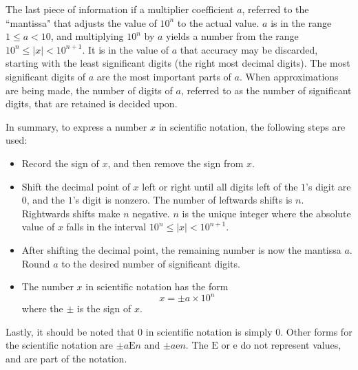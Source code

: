 \documentclass{article}
\begin{document}
The last piece of information if a multiplier coefficient \(a\), referred to the ``mantissa" that adjusts the value of \(10^n\) to the actual value. \(a\) is in the range \(1 \leq a < 10\), and multiplying \(10^n\) by \(a\) yields a number from the range \(10^n \leq |x| < 10^{n+1}\). It is in the value of \(a\) that accuracy may be discarded, starting with the least significant digits (the right most decimal digits). The most significant digits of \(a\) are the most important parts of \(a\). When approximations are being made, the number of digits of \(a\), referred to as the number of significant digits, that are retained is decided upon. 

In summary, to express a number \(x\) in scientific notation, the following steps are used: 

\begin{itemize}
\item Record the sign of \(x\), and then remove the sign from \(x\).
\item Shift the decimal point of \(x\) left or right until all digits left of the \(1\)'s digit are \(0\), and the \(1\)'s digit is nonzero. The number of leftwards shifts is \(n\). Rightwards shifts make \(n\) negative. \(n\) is the unique integer where the absolute value of \(x\) falls in the interval \(10^n \leq |x| < 10^{n+1}\).  
\item After shifting the decimal point, the remaining number is now the mantissa \(a\). Round \(a\) to the desired number of significant digits.
\item The number \(x\) in scientific notation has the form 
\[x = \pm a \times 10^n\]
where the \(\pm\) is the sign of \(x\).
\end{itemize}  
Lastly, it should be noted that \(0\) in scientific notation is simply \(0\). Other forms for the scientific notation are \(\pm a \text{E} n\) and \(\pm a \text{e} n\). The \(\text{E}\) or \(\text{e}\) do not represent values, and are part of the notation.

\end{document}
